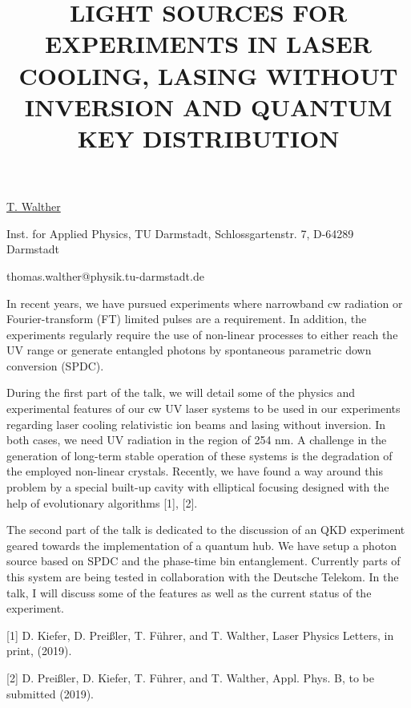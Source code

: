 \title{LIGHT SOURCES FOR EXPERIMENTS IN LASER COOLING, LASING WITHOUT INVERSION AND QUANTUM KEY DISTRIBUTION}

\underline{T. Walther}  

{\normalsize{\vspace{-4mm}
Inst. for Applied Physics,
TU Darmstadt,
Schlossgartenstr. 7,
D-64289 Darmstadt



\email thomas.walther@physik.tu-darmstadt.de}}

In recent years, we have pursued experiments where narrowband cw radiation or Fourier-transform (FT) limited pulses are a requirement. In addition, the experiments regularly require the use of non-linear processes to either reach the UV range or generate entangled photons by spontaneous parametric down conversion (SPDC).

During the first part of the talk, we will detail some of the physics and experimental features of our cw UV laser systems to be used in our experiments regarding laser cooling relativistic ion beams and lasing without inversion. In both cases, we need UV radiation in the region of 254 nm. A challenge in the generation of long-term stable operation of these systems is the degradation of the employed non-linear crystals. Recently, we have found a way around this problem by a special  built-up cavity with elliptical focusing designed with the help of evolutionary algorithms [1], [2].

The second part of the talk is dedicated to the discussion of an QKD experiment geared towards the implementation of a quantum hub. We have setup a photon source based on SPDC and the phase-time bin entanglement. Currently parts of this system are being tested in collaboration with the Deutsche Telekom. In the talk, I will discuss some of the features as well as the current status of the experiment.

{\normalsize
[1] D. Kiefer, D. Prei\ss ler, T. F{\"u}hrer, and T. Walther, Laser Physics Letters, in print, (2019).
\vsp

[2] D. Prei\ss ler, D. Kiefer,  T. F{\"u}hrer, and T. Walther,
Appl. Phys. B, to be submitted (2019).
}

\vspace{\baselineskip}